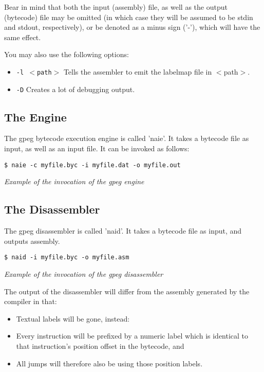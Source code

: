 Bear in mind that both the input (assembly) file, as well as the
output (bytecode) file may be omitted (in which case they will be
assumed to be stdin and stdout, respectively), or be denoted as
a minus sign ('-'), which will have the same effect.

You may also use the following options:

\begin{itemize}
\item \texttt{-l $<$path$>$} Tells the assembler to emit the labelmap
      file in $<$path$>$.
\item \texttt{-D} Creates a lot of debugging output.
\end{itemize}

\subsection{The Engine}

The gpeg bytecode execution engine is called 'naie'.
It takes a bytecode file as input, as well as an input file.
It can be invoked as follows:

\begin{myquote}
\begin{verbatim}
$ naie -c myfile.byc -i myfile.dat -o myfile.out
\end{verbatim}
\end{myquote}
\textit{Example of the invocation of the gpeg engine}

\subsection{The Disassembler}

The gpeg disassembler is called 'naid'.
It takes a bytecode file as input, and outputs assembly.

\begin{myquote}
\begin{verbatim}
$ naid -i myfile.byc -o myfile.asm
\end{verbatim}
\end{myquote}
\textit{Example of the invocation of the gpeg disassembler}

The output of the disassembler will differ from the assembly
generated by the compiler in that:

\begin{itemize}
\item Textual labels will be gone, instead:
\item Every instruction will be prefixed by a numeric label which
      is identical to that instruction's position offset in the bytecode, and
\item All jumps will therefore also be using those position labels.
\end{itemize}
